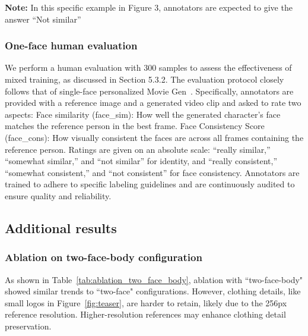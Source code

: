 \begin{enumerate}[label=-]
    \textbf{Note:} In this specific example in Figure 3, annotators are expected to give the answer ``Not similar''
\end{enumerate}


\subsubsection{One-face human evaluation}

We perform a human evaluation with 300 samples to assess the effectiveness of mixed training, as discussed in Section 5.3.2. The evaluation protocol closely follows that of single-face personalized Movie Gen~\cite{moviegen}. Specifically, annotators are provided with a reference image and a generated video clip and asked to rate two aspects:
Face similarity (face\_sim): How well the generated character’s face matches the reference person in the best frame.
Face Consistency Score (face\_cons): How visually consistent the faces are across all frames containing the reference person.
Ratings are given on an absolute scale: “really similar,” “somewhat similar,” and “not similar” for identity, and “really consistent,” “somewhat consistent,” and “not consistent” for face consistency. Annotators are trained to adhere to specific labeling guidelines and are continuously audited to ensure quality and reliability.



\subsection{Additional results}


\subsubsection{Ablation on two-face-body configuration}
\label{appendix:ablation_twofacebody}
As shown in Table~\ref{tab:ablation_two_face_body}, ablation with ``two-face-body" showed similar trends to ``two-face" configurations. However, clothing details, like small logos in Figure~\ref{fig:teaser}, are harder to retain, likely due to the 256px reference resolution. Higher-resolution references may enhance clothing detail preservation.

